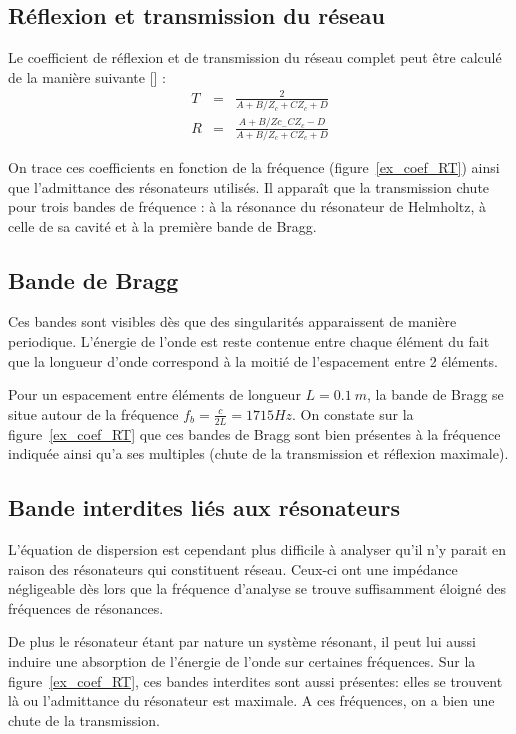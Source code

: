 \subsection{Réflexion et transmission du réseau}
Le coefficient de réflexion et de transmission du réseau complet peut être calculé de la manière suivante [] : 
\begin{eqnarray}
T & = & \frac{2}{A + B/Z_c + C Z_c + D} \\
R & = & \frac{A + B / Zc_ - C Z_c -D}{A + B/Z_c + C Z_c + D} 
\end{eqnarray}

On trace ces coefficients en fonction de la fréquence (figure~\ref{ex_coef_RT}) ainsi que l'admittance des résonateurs utilisés. Il apparaît que la transmission chute pour trois bandes de fréquence : à la résonance du résonateur de Helmholtz, à celle de sa cavité et à la première bande de Bragg.

\subsection{Bande de Bragg}
Ces bandes sont visibles dès que des singularités apparaissent de manière periodique. L'énergie de l'onde est reste contenue entre chaque élément du fait que la longueur d'onde correspond à la moitié de l'espacement entre 2 éléments. 

Pour un espacement entre éléments de longueur $L=0.1~m$, la bande de Bragg se situe autour de la fréquence $f_{b} = \frac{c}{2L} = 1715 Hz$. On constate sur la figure~\ref{ex_coef_RT} que ces bandes de Bragg sont bien présentes à la fréquence indiquée ainsi qu'a ses multiples (chute de la transmission et réflexion maximale).
 

\subsection{Bande interdites liés aux résonateurs}
L'équation de dispersion est cependant plus difficile à analyser qu'il n'y parait en raison des résonateurs qui constituent réseau. Ceux-ci ont une impédance négligeable dès lors que la fréquence d'analyse se trouve suffisamment éloigné des fréquences de résonances. 

De plus le résonateur étant par nature un système résonant, il peut lui aussi induire une absorption de l'énergie de l'onde sur certaines fréquences. Sur la figure~\ref{ex_coef_RT}, ces bandes interdites sont aussi présentes: elles se trouvent là ou l'admittance du résonateur est maximale. A ces fréquences, on a bien une chute de la transmission.

